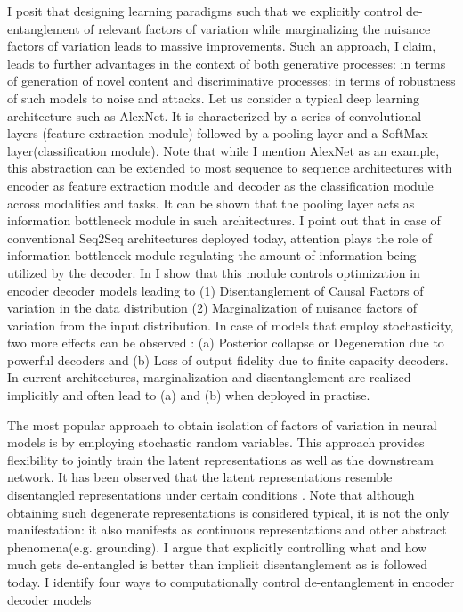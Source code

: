 I posit that designing learning paradigms such that we explicitly control de-entanglement of relevant factors of variation while marginalizing the nuisance factors of variation leads to massive improvements. Such an approach, I claim, leads to further advantages in the context of both generative processes: in terms of generation of novel content and discriminative processes: in terms of robustness of such models to noise and attacks. Let us consider a typical deep learning architecture such as AlexNet\citep{alexnet}. It is characterized by a series of convolutional layers (feature extraction module) followed by a pooling layer and a SoftMax layer(classification module). Note that while I mention AlexNet as an example, this abstraction can be extended to most sequence to sequence architectures with encoder as feature extraction module and decoder as the classification module\citep{tutorial_dataaugmentation} across modalities and tasks. It can be shown that the pooling layer acts as information bottleneck\citep{tishby2000information} module in such architectures. I point out\citep{variational_attention_rsk} that in case of conventional Seq2Seq architectures deployed today, attention plays the role of information bottleneck module regulating the amount of information being utilized by the decoder. In \citep{variational_attention_rsk,vyas2019learning} I show that this module controls optimization in encoder decoder models leading to (1) Disentanglement of Causal Factors of variation in the data distribution (2) Marginalization of nuisance factors of variation from the input distribution. In case of models that employ stochasticity, two more effects can be observed : (a) Posterior collapse or Degeneration due to powerful decoders and (b) Loss of output fidelity due to finite capacity decoders. In current architectures, marginalization and disentanglement are realized implicitly and often lead to (a) and (b) when deployed in practise.

The most popular approach to obtain isolation of factors of variation in neural models is by employing stochastic random variables. This approach provides flexibility to jointly train the latent representations as well as the downstream  network. It has been observed that the latent representations resemble disentangled representations under certain conditions \citep{isolating_sources_betavae, understanding_disentanglement_betavae,structured_disentangled_representations,hyperprior_disentanglement}. Note that although obtaining such degenerate representations is considered typical, it is not the only manifestation: it also manifests as continuous representations\citep{ravanelli2018interpretablesyncnet} and other abstract phenomena(e.g. grounding). I argue that explicitly controlling what and how much gets de-entangled \citep{understanding_disentanglement_betavae} is better than implicit disentanglement as is followed today\citep{locatello2018challenging}. I identify four ways to computationally control de-entanglement in encoder decoder models

